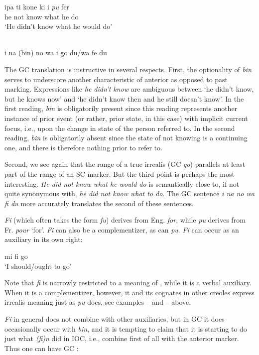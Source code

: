\ea\label{ex:2:118}
\gll ipa ti kone ki i \emph{pu} fer\\
he not {\TNS} know what he {\MOD} do \\
\glt `He didn't know what he would do'
\z

\ea\label{ex:2:119}
\langinfo{\langGC}{}{}\\
i na (bin) no wa i go du/wa fe du
\z

The GC translation is instructive in several respects. First, the optionality of \textit{bin} serves to underscore another characteristic of ante\-rior as opposed to past marking. Expressions like \textit{he didn't know} are ambiguous between `he didn't know, but he knows now' and `he didn't know then and he still doesn't know'. In the first reading, \textit{bin} is obli\-gatorily present since this reading represents another instance of prior event (or rather, prior state, in this case) with implicit current focus, i.e., upon the change in state of the person referred to. In the second reading, \textit{bin} is obligatorily absent since the state of not knowing is a continuing one, and there is therefore nothing prior to refer to.

Second, we see again that the range of a true irrealis (GC \textit{go}) parallels at least part of the range of an SC marker. But the third point is perhaps the most interesting. \textit{He did not know what he would do} is semantically close to, if not quite synonymous with, \textit{he did not know what to do}. The GC sentence \textit{i na no wa fi du} more accurately translates the second of these sentences.

\textit{Fi} (which often takes the form \textit{fu}) derives from Eng. \textit{for}, while \textit{pu} derives from Fr. \textit{pour} `for'. \textit{Fi} can also be a complementizer, as can \textit{pu}. \textit{Fi} can occur as an auxiliary in its own right:

\ea\label{ex:2:120}
mi fi go\\
\glt `I should/ought to go'
\z


Note that \textit{fi} is narrowly restricted to a meaning of , while it is a verbal auxiliary. When it is a complementizer, however, it and its cognates in other creoles express irrealis meaning just as \textit{pu} does, see examples -- and -- above.

\textit{Fi} in general does not combine with other auxiliaries, but in GC it does occasionally occur with \textit{bin}, and it is tempting to claim that it is starting to do just what \textit{(fi)n} did in IOC, i.e., combine first of all with the anterior marker. Thus one can have GC :

